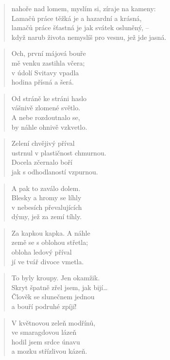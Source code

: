 \documentclass{book}
\begin{document}
\begin{verse}
nahoře nad lomem, myslím si, zíraje na kameny:\\
Lamačů práce těžká je a hazardní a krásná,\\
lamačů práce šťastná je jak svátek osluněný, --\\
když narub života nemyslíš pro vesnu, jež jde jasná.
\end{verse}
\newpage
{}
\begin{verse}
Och, první májová bouře\\
mě venku zastihla včera;\\
v údolí Svitavy vpadla\\
hodina přísná a šerá.
\end{verse}
\begin{verse}
Od stráně ke stráni haslo\\
vášnivě zlomené světlo.\\
A nebe rozdoutnalo se,\\
by náhle ohnivě vzkvetlo.
\end{verse}
\begin{verse}
Zelení chvějivý příval\\
ustrnul v plastičnost chmurnou.\\
Docela zčernalo boří\\
jak s odhodlaností vzpurnou.
\end{verse}
\begin{verse}
A pak to zaválo dolem.\\
Blesky a hromy se líhly\\
v nebesích převalujících\\
dýmy, jež za zemí tíhly.
\end{verse}
\begin{verse}
Za kapkou kapka. A náhle\\
země se s oblohou střetla;\\
obloha ledový příval\\
jí ve tvář divoce vmetla.
\end{verse}
\begin{verse}
To byly kroupy. Jen okamžik.\\
Skryt špatně zřel jsem, jak bijí\ldots\\
Člověk se slunečnem jednou\\
a bouří podruhé zpíjí!
\end{verse}
\newpage
{}
\begin{verse}
V květnovou zeleň modřínů,\\
ve smaragdovou lázeň\\
hodil jsem srdce únavu\\
a mozku střízlivou kázeň.
\end{verse}
\end{document}
